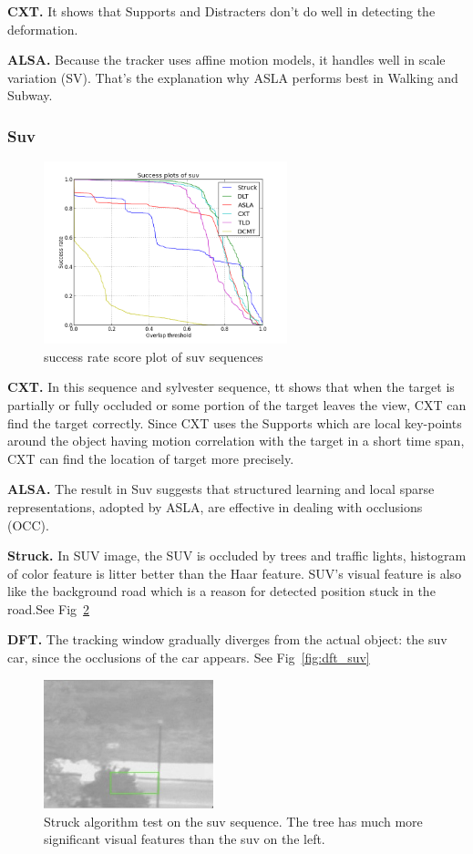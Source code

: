 \documentclass{acm_proc_article-sp}
\begin{document}
\textbf{CXT.} It shows that Supports and Distracters don't do well in detecting the deformation.

\textbf{ALSA.} Because the tracker uses affine motion models, it handles well in scale variation (SV). That’s the explanation why ASLA performs best in Walking and Subway. 

\subsubsection{Suv}

\begin{figure}[hbt]
	\centering
    \includegraphics[width=200pt]{suv}
    \caption{success rate score plot of suv sequences}
    \label{fig:suv}
\end{figure}

\textbf{CXT.} In this sequence and sylvester sequence, tt shows that when the target is partially or fully occluded or some portion of the target leaves the view, CXT can find the target correctly. Since CXT uses the Supports which are local key-points around the object having motion correlation with the target in a short time span, CXT can find the location of target more precisely.

\textbf{ALSA.} The result in Suv suggests that structured learning and local sparse representations, adopted by ASLA, are effective in dealing with occlusions (OCC).

\textbf{Struck.} In SUV image, the SUV is occluded by trees and traffic lights, histogram of color feature is litter better than the Haar feature.
SUV's visual feature is also like the background road which is a reason for detected position stuck in the road.See Fig~\ref{fig:struck_suv}

\textbf{DFT.} The tracking window gradually diverges from the actual object: the suv car, since the occlusions of the car appears. See Fig~\ref{fig:dft_suv}

\begin{figure}[hbt]
	\centering
    \includegraphics[width=140pt]{struck_suv}
    \caption{Struck algorithm test on the suv sequence. The tree has much more significant visual features than the suv on the left.}
    \label{fig:struck_suv}
\end{figure}
\end{document}
